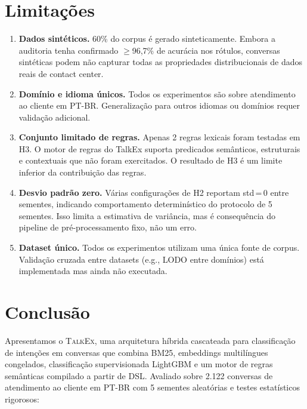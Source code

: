 \documentclass[11pt]{article}
\newcommand{\talkex}{\textsc{TalkEx}}
\begin{document}
\section{Limitações}
\label{sec:limitations}

\begin{enumerate}[leftmargin=*,itemsep=2pt]
    \item \textbf{Dados sintéticos.} 60\% do corpus é gerado sinteticamente. Embora a auditoria tenha confirmado $\geq$96,7\% de acurácia nos rótulos, conversas sintéticas podem não capturar todas as propriedades distribucionais de dados reais de contact center.
    \item \textbf{Domínio e idioma únicos.} Todos os experimentos são sobre atendimento ao cliente em PT-BR. Generalização para outros idiomas ou domínios requer validação adicional.
    \item \textbf{Conjunto limitado de regras.} Apenas 2 regras lexicais foram testadas em H3. O motor de regras do TalkEx suporta predicados semânticos, estruturais e contextuais que não foram exercitados. O resultado de H3 é um limite inferior da contribuição das regras.
    \item \textbf{Desvio padrão zero.} Várias configurações de H2 reportam std\,=\,0 entre sementes, indicando comportamento determinístico do protocolo de 5 sementes. Isso limita a estimativa de variância, mas é consequência do pipeline de pré-processamento fixo, não um erro.
    \item \textbf{Dataset único.} Todos os experimentos utilizam uma única fonte de corpus. Validação cruzada entre datasets (e.g., LODO entre domínios) está implementada mas ainda não executada.
\end{enumerate}


\section{Conclusão}
\label{sec:conclusion}

Apresentamos o \talkex{}, uma arquitetura híbrida cascateada para classificação de intenções em conversas que combina BM25, embeddings multilíngues congelados, classificação supervisionada LightGBM e um motor de regras semânticas compilado a partir de DSL. Avaliado sobre 2.122 conversas de atendimento ao cliente em PT-BR com 5 sementes aleatórias e testes estatísticos rigorosos:
\end{document}
